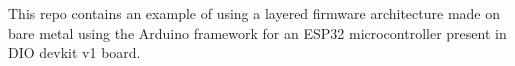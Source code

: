 This repo contains an example of using a layered firmware architecture made on bare metal using the Arduino framework for an ESP32 microcontroller present in DIO devkit v1 board. 